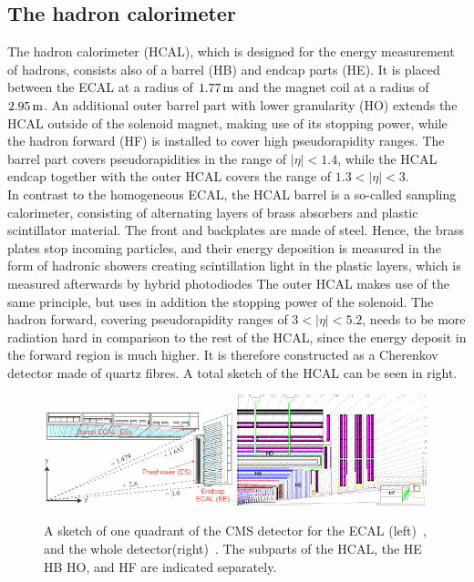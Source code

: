 \subsection{The hadron calorimeter}
The hadron calorimeter (HCAL), which is designed for the energy measurement of hadrons, consists also of a barrel (HB) and endcap parts (HE). It is placed between the ECAL at a radius of $1.77\,\text{m}$ and the magnet coil at a radius of $2.95\,\text{m}$. An additional outer barrel part with lower granularity (HO) extends the HCAL outside of the solenoid magnet, making use of its stopping power, while the hadron forward (HF) is installed to cover high pseudorapidity ranges. The barrel part covers pseudorapidities in the range of $|\eta|<1.4$, while the HCAL endcap together with the outer HCAL covers the range of $1.3<|\eta|<3$.\\
In contrast to the homogeneous ECAL, the HCAL barrel is a so-called sampling calorimeter, consisting of alternating layers of brass absorbers and plastic scintillator material. The front and backplates are made of steel. Hence, the brass plates stop incoming particles, and their energy deposition is measured in the form of hadronic showers creating scintillation light in the plastic layers, which is measured afterwards by hybrid photodiodes The outer HCAL makes use of the same principle, but uses in addition the stopping power of the solenoid. The hadron forward, covering pseudorapidity ranges of $3<|\eta|<5.2$, needs to be more radiation hard in comparison to the rest of the HCAL, since the energy deposit in the forward region is much higher. It is therefore constructed as a Cherenkov detector made of quartz fibres. A total sketch of the HCAL can be seen in  right.

\begin{figure}[bp]
 \vspace{\baselineskip}
 
 \centering
 \includegraphics[width=0.49\textwidth]{figures/general/ecal}
 \includegraphics[width=0.49\textwidth]{figures/general/hcal}
 \caption{A sketch of one quadrant of the CMS detector for the ECAL (left)~\cite{ECALPicture}, and the whole detector(right)~\cite{CMS}. The subparts of the HCAL, the HE HB HO, and HF are indicated separately.}
 \label{fig:etaPlaneCMS}
\end{figure}

